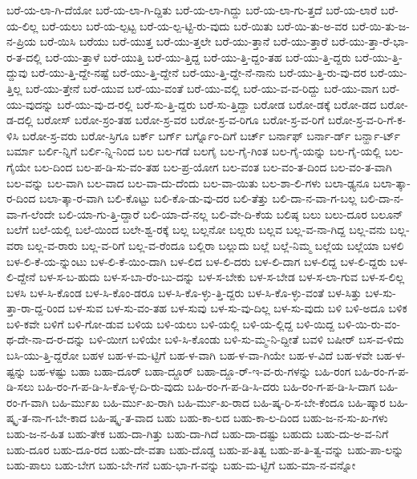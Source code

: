 {ಬರೆ-ಯ-ಲಾ-ಗಿ-ದೆಯೋ
ಬರೆ-ಯ-ಲಾ-ಗಿ-ದ್ದಿತು
ಬರೆ-ಯ-ಲಾ-ಗಿದ್ದು
ಬರೆ-ಯ-ಲಾ-ಗು-ತ್ತದೆ
ಬರೆ-ಯ-ಲಾರೆ
ಬರೆ-ಯ-ಲಿಲ್ಲ
ಬರೆ-ಯಲು
ಬರೆ-ಯ-ಲ್ಪಟ್ಟ
ಬರೆ-ಯ-ಲ್ಪ-ಟ್ಟಿ-ರು-ವುದು
ಬರೆ-ಯಿತು
ಬರೆ-ಯಿ-ತು-ಅ-ವರ
ಬರೆ-ಯಿ-ತು-ಜ-ನ-ಪ್ರಿಯ
ಬರೆ-ಯಿಸಿ
ಬರೆಯು
ಬರೆ-ಯುತ್ತ
ಬರೆ-ಯು-ತ್ತಲೇ
ಬರೆ-ಯು-ತ್ತಾನೆ
ಬರೆ-ಯು-ತ್ತಾರೆ
ಬರೆ-ಯು-ತ್ತಾ-ರೆ-ಭಾ-ರ-ತ-ದಲ್ಲಿ
ಬರೆ-ಯು-ತ್ತಾಳೆ
ಬರೆ-ಯುತ್ತಿ
ಬರೆ-ಯು-ತ್ತಿದ್ದ
ಬರೆ-ಯು-ತ್ತಿ-ದ್ದಂ-ತಹ
ಬರೆ-ಯು-ತ್ತಿ-ದ್ದರು
ಬರೆ-ಯು-ತ್ತಿ-ದ್ದುವು
ಬರೆ-ಯು-ತ್ತಿ-ದ್ದೇ-ನಷ್ಟೆ
ಬರೆ-ಯು-ತ್ತಿ-ದ್ದೇನೆ
ಬರೆ-ಯು-ತ್ತಿ-ದ್ದೇ-ನೆ-ನಾನು
ಬರೆ-ಯು-ತ್ತಿ-ರು-ವು-ದರ
ಬರೆ-ಯು-ತ್ತಿಲ್ಲ
ಬರೆ-ಯು-ತ್ತೇನೆ
ಬರೆ-ಯುವ
ಬರೆ-ಯು-ವಂತೆ
ಬರೆ-ಯು-ವಲ್ಲಿ
ಬರೆ-ಯು-ವ-ವ-ರಿದ್ದು
ಬರೆ-ಯು-ವಾಗ
ಬರೆ-ಯು-ವುದನ್ನು
ಬರೆ-ಯು-ವು-ದ-ರಲ್ಲಿ
ಬರೆ-ಸು-ತ್ತಿ-ದ್ದರು
ಬರೆ-ಸು-ತ್ತಿದ್ದಾ
ಬರೋಡ
ಬರೋ-ಡಕ್ಕೆ
ಬರೋ-ಡದ
ಬರೋ-ಡ-ದಲ್ಲಿ
ಬರೋಸ್
ಬರೋ-ಸ್ರಂ-ತಹ
ಬರೋ-ಸ್ರ-ವರ
ಬರೋ-ಸ್ರ-ವ-ರಿಗೂ
ಬರೋ-ಸ್ರ-ವ-ರಿಗೆ
ಬರೋ-ಸ್ರ-ವ-ರಿ-ಗೆ-ಕ-ಳಿಸಿ
ಬರೋ-ಸ್ರ-ವರು
ಬರೋ-ಸ್ರಿಗೂ
ಬರ್ಕ್
ಬರ್ಗ್
ಬರ್ಗ್ನೊಂ-ದಿಗೆ
ಬರ್ಚ್
ಬರ್ನಾಫ್
ಬರ್ನಾ-ರ್ಡ್
ಬರ್ನ್ಹಾ-ರ್ಟ್
ಬರ್ಮಾ
ಬರ್ಲಿ-ನ್ನಿಗೆ
ಬರ್ಲಿ-ನ್ನಿ-ನಿಂದ
ಬಲ
ಬಲ-ಗಡೆ
ಬಲಗೈ
ಬಲ-ಗೈ-ಗಿಂತ
ಬಲ-ಗೈ-ಯನ್ನು
ಬಲ-ಗೈ-ಯಲ್ಲಿ
ಬಲ-ಗೈಯೇ
ಬಲ-ದಿಂದ
ಬಲ-ಪ-ಡಿ-ಸು-ವಂ-ತಹ
ಬಲ-ಪ್ರ-ಯೋಗ
ಬಲ-ವಂತ
ಬಲ-ವಂ-ತ-ದಿಂದ
ಬಲ-ವಂ-ತ-ವಾಗಿ
ಬಲ-ವನ್ನು
ಬಲ-ವಾಗಿ
ಬಲ-ವಾದ
ಬಲ-ವಾ-ದು-ದೆಂದು
ಬಲ-ವಾ-ಯಿತು
ಬಲ-ಶಾ-ಲಿ-ಗಳು
ಬಲಾ-ಢ್ಯನೂ
ಬಲಾ-ತ್ಕಾ-ರ-ದಿಂದ
ಬಲಾ-ತ್ಕಾ-ರ-ವಾಗಿ
ಬಲಿ-ಕೊಟ್ಟು
ಬಲಿ-ಕೊ-ಡು-ವು-ದರ
ಬಲಿ-ತೆತ್ತು
ಬಲಿ-ದಾ-ನ-ವಾ-ಗ-ಬಲ್ಲ
ಬಲಿ-ದಾ-ನ-ವಾ-ಗ-ಲೆಂದೇ
ಬಲಿ-ಯಾ-ಗು-ತ್ತಿ-ದ್ದಾರೆ
ಬಲಿ-ಯಾ-ದೆ-ನಲ್ಲ
ಬಲಿ-ವೇ-ದಿ-ಕೆಯ
ಬಲಿಷ್ಠ
ಬಲು
ಬಲು-ದೂರ
ಬಲೂನ್
ಬಲೆಗೆ
ಬಲೆ-ಯಲ್ಲಿ
ಬಲೆ-ಯಿಂದ
ಬಲೇ-ಶ್ವ-ರಕ್ಕೆ
ಬಲ್ಲ
ಬಲ್ಲನೋ
ಬಲ್ಲರು
ಬಲ್ಲವ
ಬಲ್ಲ-ವ-ನಾ-ಗಿದ್ದ
ಬಲ್ಲ-ವನು
ಬಲ್ಲ-ವರಾ
ಬಲ್ಲ-ವ-ರಾರು
ಬಲ್ಲ-ವ-ರಿಗೆ
ಬಲ್ಲ-ವ-ರೆಂದೂ
ಬಲ್ಲಿರಾ
ಬಲ್ಲುದು
ಬಲ್ಲೆ
ಬಲ್ಲೆ-ನಿಮ್ಮ
ಬಲ್ಲೆಯ
ಬಲ್ಲೆಯಾ
ಬಳಲಿ
ಬಳ-ಲಿ-ಕೆ-ಯ-ನ್ನುಂಟು
ಬಳ-ಲಿ-ಕೆ-ಯಿಂ-ದಾಗಿ
ಬಳ-ಲಿದ
ಬಳ-ಲಿ-ದರು
ಬಳ-ಲಿ-ದಾಗ
ಬಳ-ಲಿದ್ದ
ಬಳ-ಲಿ-ದ್ದರು
ಬಳ-ಲಿ-ದ್ದೇನೆ
ಬಳ-ಸ-ಬ-ಹುದು
ಬಳ-ಸ-ಬಾ-ರೆಂ-ಬು-ದನ್ನು
ಬಳ-ಸ-ಬೇಕು
ಬಳ-ಸ-ಬೇಡ
ಬಳ-ಸ-ಲಾ-ಗುವ
ಬಳ-ಸ-ಲಿಲ್ಲ
ಬಳಸಿ
ಬಳ-ಸಿ-ಕೊಂಡ
ಬಳ-ಸಿ-ಕೊಂ-ಡರೂ
ಬಳ-ಸಿ-ಕೊ-ಳ್ಳು-ತ್ತಿ-ದ್ದರು
ಬಳ-ಸಿ-ಕೊ-ಳ್ಳು-ವಂತೆ
ಬಳ-ಸಿತ್ತು
ಬಳ-ಸು-ತ್ತಾ-ರಾ-ದ್ದ-ರಿಂದ
ಬಳ-ಸುವ
ಬಳ-ಸು-ವಂ-ತಹ
ಬಳ-ಸುವು
ಬಳ-ಸು-ವು-ದಿಲ್ಲ
ಬಳ-ಸು-ವುದು
ಬಳಿ
ಬಳಿ-ಅದೂ
ಬಳಿಕ
ಬಳಿ-ಕವೇ
ಬಳಿಗೆ
ಬಳಿ-ಗೋ-ಡುವ
ಬಳಿಯ
ಬಳಿ-ಯಲು
ಬಳಿ-ಯಲ್ಲಿ
ಬಳಿ-ಯ-ಲ್ಲಿದ್ದ
ಬಳಿ-ಯಿದ್ದ
ಬಳಿ-ಯಿ-ರು-ವಂ-ಥ-ದೇ-ನಾ-ದ-ರ-ದನ್ನು
ಬಳಿ-ಯೀಗ
ಬಳಿಯೇ
ಬಳಿ-ಸಿ-ಕೊಂಡು
ಬಳಿ-ಸು-ಮ್ಮ-ನಿ-ದ್ದೀತೆ
ಬವಳಿ
ಬಷೀರ್
ಬಸ-ವ-ಳಿದು
ಬಸಿ-ಯು-ತ್ತಿ-ದ್ದರೋ
ಬಹಳ
ಬಹ-ಳ-ಮ-ಟ್ಟಿಗೆ
ಬಹ-ಳ-ವಾಗಿ
ಬಹ-ಳ-ವಾ-ಗಿಯೇ
ಬಹ-ಳ-ವಿದೆ
ಬಹ-ಳವೇ
ಬಹ-ಳ-ಷ್ಟನ್ನು
ಬಹ-ಳಷ್ಟು
ಬಹಾ
ಬಹಾ-ದೂರ್
ಬಹಾ-ದ್ದೂರ್
ಬಹಾ-ದ್ದೂ-ರ್-ಇ-ವ-ರು-ಗಳನ್ನು
ಬಹಿ-ರಂಗ
ಬಹಿ-ರಂ-ಗ-ಪ-ಡಿ-ಸಲು
ಬಹಿ-ರಂ-ಗ-ಪ-ಡಿ-ಸಿ-ಕೊ-ಳ್ಳ-ದಿ-ರು-ವುದು
ಬಹಿ-ರಂ-ಗ-ಪ-ಡಿ-ಸಿ-ದರು
ಬಹಿ-ರಂ-ಗ-ಪ-ಡಿ-ಸಿ-ದಾಗ
ಬಹಿ-ರಂ-ಗ-ವಾಗಿ
ಬಹಿ-ರ್ಮುಖ
ಬಹಿ-ರ್ಮು-ಖ-ರಾಗಿ
ಬಹಿ-ರ್ಮು-ಖ-ರಾದ
ಬಹಿ-ಷ್ಕ-ರಿ-ಸ-ಬೇ-ಕೆಂದೂ
ಬಹಿ-ಷ್ಕಾರ
ಬಹಿ-ಷ್ಕೃ-ತ-ನಾ-ಗ-ಬೇ-ಕಾದ
ಬಹಿ-ಷ್ಕೃ-ತ-ವಾದ
ಬಹು
ಬಹು-ಕಾ-ಲದ
ಬಹು-ಕಾ-ಲ-ದಿಂದ
ಬಹು-ಜ-ನ-ಸು-ಖ-ಗಳು
ಬಹು-ಜ-ನ-ಹಿತ
ಬಹು-ತೇಕ
ಬಹು-ದಾ-ಗಿತ್ತು
ಬಹು-ದಾ-ಗಿದೆ
ಬಹು-ದಾ-ದಷ್ಟು
ಬಹುದು
ಬಹು-ದು-ಅ-ವ-ನಿಗೆ
ಬಹು-ದೂರ
ಬಹು-ದೂ-ರದ
ಬಹು-ದೇ-ವತಾ
ಬಹು-ದೊಡ್ಡ
ಬಹು-ಪ-ತಿತ್ವ
ಬಹು-ಪ-ತಿ-ತ್ವ-ವನ್ನು
ಬಹು-ಪಾ-ಲನ್ನು
ಬಹು-ಪಾಲು
ಬಹು-ಬೇಗ
ಬಹು-ಬೇ-ಗನೆ
ಬಹು-ಭಾ-ಗ-ವನ್ನು
ಬಹು-ಮ-ಟ್ಟಿಗೆ
ಬಹು-ಮಾ-ನ-ವನ್ನೋ
}
